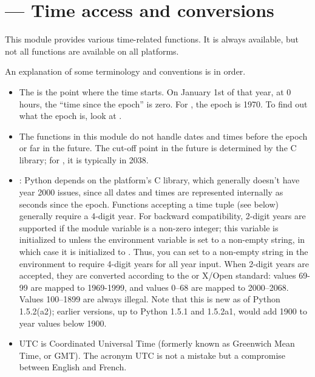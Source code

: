\section{ ---
         Time access and conversions}



This module provides various time-related functions.
It is always available, but not all functions are available
on all platforms.

An explanation of some terminology and conventions is in order.

\begin{itemize}

\item
The  is the point where the time starts.  On
January 1st of that year, at 0 hours, the ``time since the epoch'' is
zero.  For \UNIX, the epoch is 1970.  To find out what the epoch is,
look at .

\item
The functions in this module do not handle dates and times before the
epoch or far in the future.  The cut-off point in the future is
determined by the C library; for \UNIX, it is typically in
2038.

\item
{}:  Python
depends on the platform's C library, which generally doesn't have year
2000 issues, since all dates and times are represented internally as
seconds since the epoch.  Functions accepting a time tuple (see below)
generally require a 4-digit year.  For backward compatibility, 2-digit
years are supported if the module variable  is a
non-zero integer; this variable is initialized to  unless the
environment variable  is set to a non-empty string,
in which case it is initialized to .  Thus, you can set
 to a non-empty string in the environment to require 4-digit
years for all year input.  When 2-digit years are accepted, they are
converted according to the \POSIX{} or X/Open standard: values 69-99
are mapped to 1969-1999, and values 0--68 are mapped to 2000--2068.
Values 100--1899 are always illegal.  Note that this is new as of
Python 1.5.2(a2); earlier versions, up to Python 1.5.1 and 1.5.2a1,
would add 1900 to year values below 1900.

\item
UTC is Coordinated Universal Time (formerly known as Greenwich Mean
Time, or GMT).  The acronym UTC is not a
mistake but a compromise between English and French.


\end{itemize}
